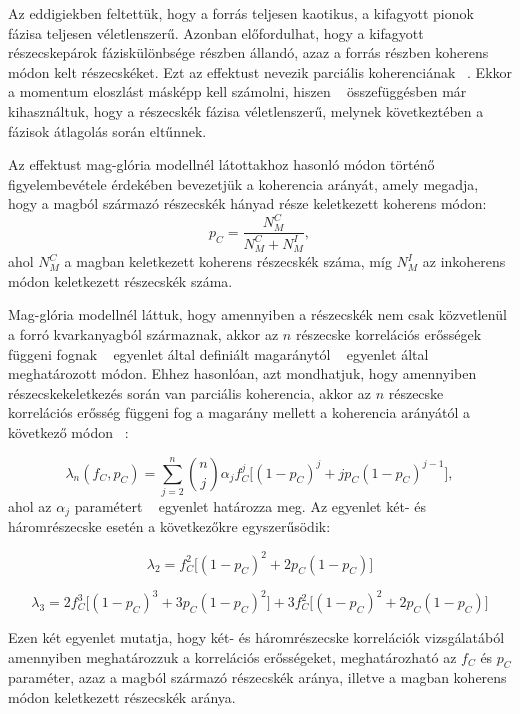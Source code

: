 \documentclass[11pt,a4paper]{article}
\numberwithin{equation}{subsection}
\numberwithin{figure}{section}
\begin{document}
Az eddigiekben feltettük, hogy a forrás teljesen kaotikus, a kifagyott pionok fázisa teljesen véletlenszerű. Azonban előfordulhat, hogy a kifagyott részecskepárok fáziskülönbsége részben állandó, azaz a forrás részben koherens módon kelt részecskéket. Ezt az effektust nevezik parciális koherenciának ~\cite{Csorgo:1998tn, Csorgo:1999sj, Csorgo:1997uf}. Ekkor a momentum eloszlást másképp kell számolni, hiszen ~ összefüggésben már kihasználtuk, hogy a részecskék fázisa véletlenszerű, melynek következtében a fázisok átlagolás során eltűnnek. 

Az effektust mag-glória modellnél látottakhoz hasonló módon történő figyelembevétele érdekében bevezetjük a koherencia arányát, amely megadja, hogy a magból származó részecskék hányad része keletkezett koherens módon:
\begin{equation}
p_C = \frac{N_M^C}{N_M^C+N_M^I},
\end{equation}
ahol $N_M^C$ a magban keletkezett koherens részecskék száma, míg $N_M^I$ az inkoherens módon keletkezett részecskék száma.

Mag-glória modellnél láttuk, hogy amennyiben a részecskék nem csak közvetlenül a forró kvarkanyagból származnak, akkor az $n$ részecske korrelációs erősségek függeni fognak ~ egyenlet által definiált magaránytól ~ egyenlet által meghatározott módon. Ehhez hasonlóan, azt mondhatjuk, hogy amennyiben részecskekeletkezés során van parciális koherencia, akkor az $n$ részecske korrelációs erősség függeni fog a magarány mellett a koherencia arányától a következő módon ~\cite{Csorgo:1998tn, Csorgo:1997uf}:

\begin{equation}
\lambda_n(f_C, p_C) = \sum_{j=2}^{n}\binom{n}{j}\alpha_j f_C^j\big[(1-p_C)^j+jp_C(1-p_C)^{j-1}\big],
\end{equation}
ahol az $\alpha_j$ paramétert ~ egyenlet határozza meg. Az egyenlet két- és háromrészecske esetén a következőkre egyszerűsödik:

\begin{equation}
\lambda_2 =  f_C^2\big[(1-p_C)^2+2p_C(1-p_C)\big]
\end{equation}

\begin{equation}
\lambda_3 =  2f_C^3\big[(1-p_C)^3+3p_C(1-p_C)^2\big]+3f_C^2\big[(1-p_C)^2+2p_C(1-p_C)\big]
\end{equation}

Ezen két egyenlet mutatja, hogy két- és háromrészecske korrelációk vizsgálatából amennyiben meghatározzuk a korrelációs erősségeket, meghatározható az $f_C$ és $p_C$ paraméter, azaz a magból származó részecskék aránya, illetve a magban koherens módon keletkezett részecskék aránya.
\end{document}
